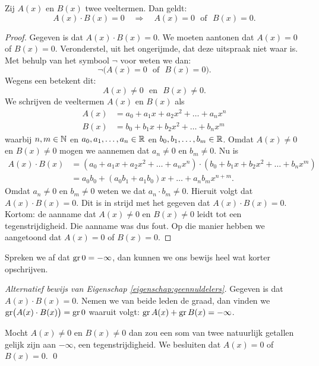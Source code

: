 \documentclass{ximera}
\begin{document}
\begin{eigenschap} \label{eigenschap:geennuldelers}
Zij $A(x)$ en $B(x)$ twee veeltermen. Dan geldt: 
\[
A(x)\cdot B(x) = 0 \quad \Rightarrow \quad A(x) = 0 \,\,\text{ of } \,\, B(x) = 0.
\]
\end{eigenschap}
\begin{proof}
Gegeven is dat $A(x)\cdot B(x) = 0$. We moeten aantonen dat $A(x) = 0$ of $B(x) = 0$. Veronderstel, uit het ongerijmde, dat deze uitspraak niet waar is. Met behulp van het symbool $\neg$ voor 
 weten we dan:
\[
\neg\bigl(A(x) = 0 \,\, \text{ of } \,\, B(x) = 0\bigr).
\]
Wegens een  betekent dit:
\[
A(x) \neq 0 \,\, \text{ en } \,\, B(x) \neq 0.
\] 
We schrijven de veeltermen $A(x)$ en $B(x)$ als
\begin{align*}
A(x) & = a_0 + a_1 x + a_2 x^2 + \dots + a_n x^n \\
B(x) & = b_0 + b_1 x + b_2 x^2 + \dots + b_n x^m
\end{align*}
waarbij $n,m \in \mathbb{N}$ en $a_0, a_1, \ldots, a_n \in \mathbb{R}$ en $b_0, b_1, \ldots, b_m \in \mathbb{R}$. Omdat $A(x) \neq 0$ en $B(x) \neq 0$ mogen we aannemen dat $a_n \neq 0$ en $b_m \neq 0$. Nu is
\begin{align*}
A(x) \cdot B(x) 
& = \left(a_0 + a_1 x + a_2 x^2 + \dots + a_n x^n\right) \cdot \left( b_0 + b_1 x + b_2 x^2 + \dots + b_n x^m\right) \\
& = a_0b_0 + (a_0b_1 + a_1b_0)x + \dots + a_n b_m x^{n+m}.
\end{align*}
Omdat $a_n \neq 0$ en $b_m \neq 0$ weten we dat $a_n \cdot b_m \neq 0$. Hieruit volgt dat $A(x) \cdot B(x) = 0$. Dit is in strijd met het gegeven dat $A(x)\cdot B(x) = 0$. Kortom: de aanname dat $A(x) \neq 0$ en $B(x) \neq 0$ leidt tot een tegenstrijdigheid. Die aanname was dus fout. Op die manier hebben we aangetoond dat $A(x) = 0$ of $B(x) = 0$. 
\end{proof}

\begin{Uitbreiding}
Spreken we af dat $\operatorname{gr} 0 = - \infty$, dan kunnen we ons bewijs heel wat korter opschrijven. 

{\em Alternatief bewijs van Eigenschap \ref{eigenschap:geennuldelers}.}
Gegeven is dat $A(x)\cdot B(x) = 0$. Nemen we van beide leden de graad, dan vinden we $\operatorname{gr}\bigl( A(x)\cdot B(x) \bigr) = \operatorname{gr} 0$ waaruit volgt: $\operatorname{gr} A(x) + \operatorname{gr} B(x) = - \infty$.

Mocht $A(x) \neq 0$ en $B(x) \neq 0$ dan zou een som van twee natuurlijk getallen gelijk zijn aan $-\infty$, een tegenstrijdigheid. We besluiten dat $A(x) = 0$ of $B(x) = 0$.
\qed
\end{Uitbreiding}
\end{document}
